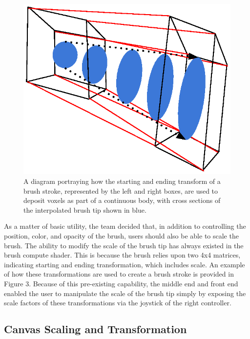 \documentclass[onecolumn, draftclsnofoot,10pt, compsoc]{IEEEtran}
\begin{document}
\begin{figure}[h]
\centering
\includegraphics{Transform.eps}
\caption{A diagram portraying how the starting and ending transform of a brush stroke, represented by the left and right boxes, are used to deposit voxels as part of a continuous body, with cross sections of the interpolated brush tip shown in blue.}
\end{figure}


As a matter of basic utility, the team decided that, in addition to controlling the position, color, and opacity of the brush, users should also be able to scale the brush. The ability to modify the scale of the brush tip has always existed in the brush compute shader. This is because the brush relies upon two 4x4 matrices, indicating starting and ending transformation, which includes scale. An example of how these transformations are used to create a brush stroke is provided in Figure 3. Because of this pre-existing capability, the middle end and front end enabled the user to manipulate the scale of the brush tip simply by exposing the scale factors of these transformations via the joystick of the right controller.

\subsection{Canvas Scaling and Transformation}
\end{document}
